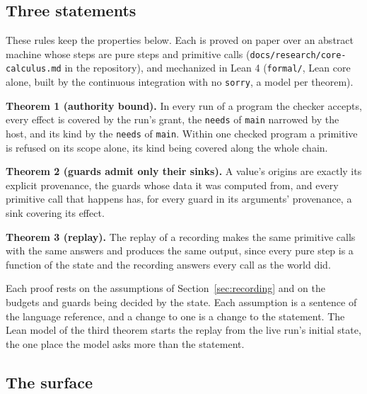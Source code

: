 \documentclass[11pt]{article}
\begin{document}
\subsection{Three statements}
\label{sec:statements}

These rules keep the properties below. Each is proved on paper over an
abstract machine whose steps are pure steps and primitive calls
(\texttt{docs/research/}\allowbreak\texttt{core-calculus.md} in the
repository), and mechanized in Lean 4 (\texttt{formal/}, Lean core
alone, built by the continuous integration with no \texttt{sorry}, a
model per theorem).

\textbf{Theorem 1 (authority bound).} In every run of a program the
checker accepts, every effect is covered by the run's grant, the
\texttt{needs} of \texttt{main} narrowed by the host, and its kind by
the \texttt{needs} of \texttt{main}. Within one checked program a
primitive is refused on its scope alone, its kind being covered along
the whole chain.

\textbf{Theorem 2 (guards admit only their sinks).} A value's origins
are exactly its explicit provenance, the guards whose data it was
computed from, and every primitive call that happens has, for every
guard in its arguments' provenance, a sink covering its effect.

\textbf{Theorem 3 (replay).} The replay of a recording makes the same
primitive calls with the same answers and produces the same output,
since every pure step is a function of the state and the recording
answers every call as the world did.

Each proof rests on the assumptions of Section~\ref{sec:recording} and
on the budgets and guards being decided by the state. Each assumption
is a sentence of the language reference, and a change to one is a
change to the statement. The Lean model of the third theorem starts the
replay from the live run's initial state, the one place the model asks
more than the statement.

\subsection{The surface}
\end{document}
